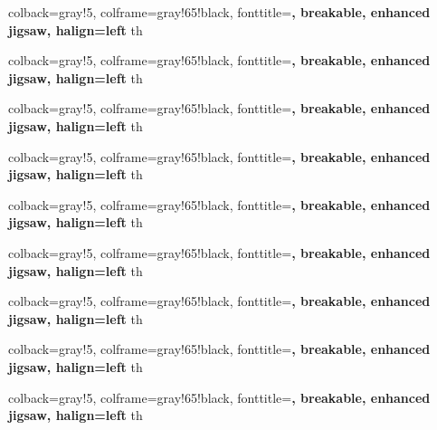 
%
{	colback=gray!5, 
	colframe=gray!65!black, 
	fonttitle=\bfseries, 
	breakable, 
	enhanced jigsaw, 
	halign=left
}{th}

%
{	colback=gray!5, 
	colframe=gray!65!black, 
	fonttitle=\bfseries, breakable, 
	enhanced jigsaw, 
	halign=left
}{th}

%
{	colback=gray!5, 
	colframe=gray!65!black, 
	fonttitle=\bfseries, 
	breakable, 
	enhanced jigsaw, 
	halign=left
}{th}

%
{	colback=gray!5, 
	colframe=gray!65!black, 
	fonttitle=\bfseries, 
	breakable, 
	enhanced jigsaw, 
	halign=left
}{th}

%
{	colback=gray!5, 
	colframe=gray!65!black, 
	fonttitle=\bfseries, 
	breakable, 
	enhanced jigsaw, 
	halign=left
}{th}

%
{	colback=gray!5, 
	colframe=gray!65!black, 
	fonttitle=\bfseries, 
	breakable, 
	enhanced jigsaw, 
	halign=left
}{th}

%
{	colback=gray!5, 
	colframe=gray!65!black, 
	fonttitle=\bfseries, 
	breakable, 
	enhanced jigsaw, 
	halign=left
}{th}

%
{	colback=gray!5, 
	colframe=gray!65!black, 
	fonttitle=\bfseries, 
	breakable, 
	enhanced jigsaw, 
	halign=left
}{th}

%
{	colback=gray!5, 
	colframe=gray!65!black, 
	fonttitle=\bfseries, 
	breakable, 
	enhanced jigsaw, 
	halign=left
}{th}





\raggedright